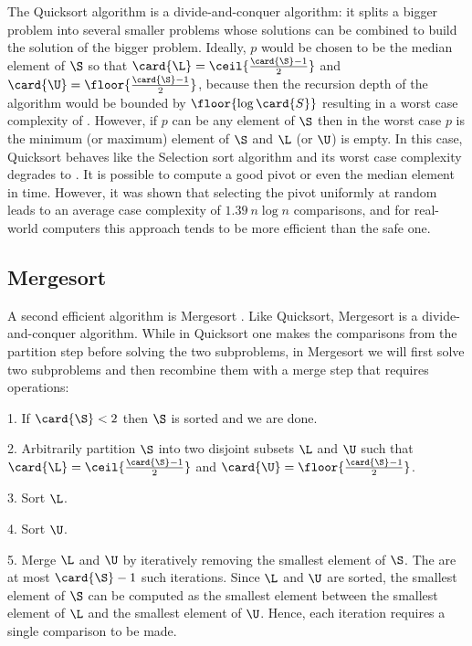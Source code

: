 The Quicksort algorithm is a divide-and-conquer algorithm: it splits a
bigger problem into several smaller problems whose solutions can be combined
to build the solution of the bigger problem. Ideally, \(p\) would be chosen to
be the median element of \(\S\) so that \(\card{\L} =
\ceil{\frac{\card{\S}-1}{2}}\) and \(\card{\U} =
\floor{\frac{\card{\S}-1}{2}}\), because then the recursion depth of the
algorithm would be bounded by \(\floor{\log \card{S}}\) resulting in a worst
case complexity of . However, if \(p\) can be any element of
\(\S\) then in the worst case \(p\) is the minimum (or maximum) element of
\(\S\) and \(\L\) (or \(\U\)) is empty. In this case, Quicksort behaves like
the Selection sort algorithm and its worst case complexity degrades to
. It is possible \cite{blum:1973} to compute a good pivot or even the
median element in  time. However, it was shown \cite{hoare:1962} that
selecting the pivot uniformly at random leads to an average case complexity of
\(1.39~n \log n\) comparisons, and for real-world computers this approach tends
to be more efficient than the safe one.

\subsection*{Mergesort}

A second efficient algorithm is Mergesort
\cite{goldstine:1948,leiserson:2001}. Like Quicksort, Mergesort is a
divide-and-conquer algorithm. While in Quicksort one makes the comparisons from
the partition step before solving the two subproblems, in Mergesort we will
first solve two subproblems and then recombine them with a merge step that
requires  operations:

\begin{algorithm}
\item[1.] If \(\card{\S} < 2\) then \(\S\) is sorted and we are done.
\item[2.] Arbitrarily partition \(\S\) into two disjoint subsets \(\L\) and
\(\U\) such that \(\card{\L} = \ceil{\frac{\card{\S}-1}{2}}\) and \(\card{\U} =
\floor{\frac{\card{\S}-1}{2}}\).
\item[3.] Sort \(\L\).
\item[4.] Sort \(\U\).
\item[5.] Merge \(\L\) and \(\U\) by iteratively removing the smallest element
of \(\S\). The are at most \(\card{\S} - 1\) such iterations. Since \(\L\) and
\(\U\) are sorted, the smallest element of \(\S\) can be computed as the
smallest element between the smallest element of \(\L\) and the smallest
element of \(\U\). Hence, each iteration requires a single comparison to be made.
\end{algorithm}

